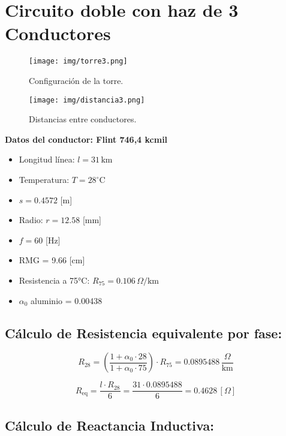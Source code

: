 \section*{Circuito doble con haz de 3 Conductores}

\begin{figure}[ht!]
\centering
\texttt{[image: img/torre3.png]}
\caption{Configuración de la torre.}
\label{fig:torre3}
\end{figure}



\begin{figure}[ht!]
\centering
\texttt{[image: img/distancia3.png]}
\caption{Distancias entre conductores.}
\label{fig:distancia3}
\end{figure}



\textbf{Datos del conductor: Flint 746,4 kcmil}
\begin{itemize}
  \item Longitud línea: $l = 31 \, \text{km}$
  \item Temperatura: $T = 28^\circ$C
  \item $s = 0.4572$ [m]
  \item Radio: $r = 12.58$ [mm]
  \item $f = 60$ [Hz]
  \item RMG = 9.66 [cm]
  \item Resistencia a 75°C: $R_{75} = 0.106 \, \Omega/\text{km}$
  \item $\alpha_0$ aluminio = 0.00438
\end{itemize}

\vspace{0.5cm}

\subsection*{Cálculo de Resistencia equivalente por fase:}

\[
R_{28} = \left( \frac{1 + \alpha_0 \cdot28}{1 + \alpha_0 \cdot 75} \right) \cdot R_{75} = 0.0895488 \, \frac{\Omega}{\text{km}}
\]

\[
R_{\text{eq}} = \frac{l \cdot R_{28}}{6} = \frac{31 \cdot 0.0895488}{6} = 0.4628 \, [\Omega]
\]

\vspace{0.5cm}
\subsection*{Cálculo de Reactancia Inductiva:}

